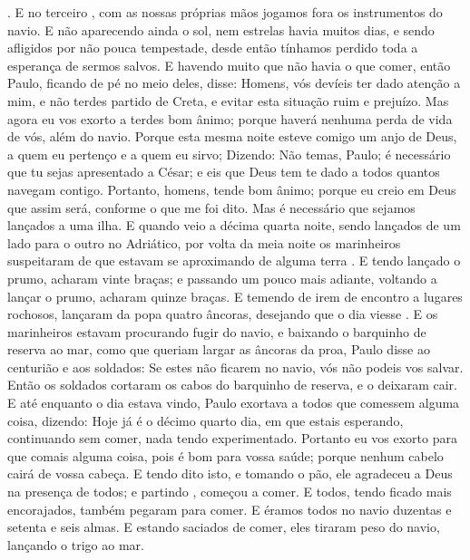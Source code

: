 {{} .
  E no terceiro
{},  com as nossas próprias mãos jogamos fora os instrumentos do navio.
  E não aparecendo ainda o sol, nem estrelas havia muitos dias, e sendo afligidos por não pouca tempestade, desde então tínhamos perdido toda a esperança de sermos salvos.
  E havendo muito
{} que não havia o que comer, então Paulo, ficando de pé no meio deles, disse: Homens, vós devíeis ter dado atenção a mim, e não terdes partido de Creta, e
{} evitar esta situação ruim e prejuízo.
  Mas agora eu vos exorto a terdes bom ânimo; porque haverá nenhuma perda de vida de vós, além
{} do navio.
  Porque esta mesma noite esteve comigo um anjo de Deus, a quem eu pertenço e a quem eu sirvo;
  Dizendo: Não temas, Paulo; é necessário que tu sejas apresentado a César; e eis que Deus tem te dado
{} a todos quantos navegam contigo.
  Portanto, homens, tende bom ânimo; porque eu creio em Deus que assim será, conforme o que me foi dito.
  Mas é necessário que sejamos lançados a uma ilha.
  E quando veio a décima quarta noite, sendo lançados de um lado para o outro no
{} Adriático, por volta da meia noite os marinheiros suspeitaram de que estavam se aproximando de alguma terra
{} .
  E tendo lançado o prumo, acharam vinte braças; e passando um pouco mais adiante, voltando a lançar o prumo, acharam quinze braças.
  E temendo de irem de encontro a lugares rochosos, lançaram da popa quatro âncoras, desejando que o dia viesse
{} .
  E
{} os marinheiros estavam procurando fugir do navio, e baixando o barquinho de reserva ao mar, como que queriam largar as âncoras da proa,
  Paulo disse ao centurião e aos soldados: Se estes não ficarem no navio, vós não podeis vos salvar.
  Então os soldados cortaram os cabos do barquinho de reserva, e o deixaram cair.
  E até enquanto o dia estava vindo, Paulo exortava a todos que comessem alguma coisa, dizendo: Hoje já é o décimo quarto dia, em que estais esperando, continuando sem comer, nada tendo experimentado.
  Portanto eu vos exorto para que comais alguma coisa, pois é bom para vossa saúde; porque nenhum cabelo cairá de vossa cabeça.
  E tendo dito isto, e tomando o pão, ele agradeceu a Deus na presença de todos; e partindo
{},  começou a comer.
  E todos, tendo ficado mais encorajados, também pegaram
{} para comer.
  E éramos todos no navio duzentas e setenta e seis almas.
  E estando saciados de comer, eles tiraram peso do navio, lançando o trigo ao mar.
}
